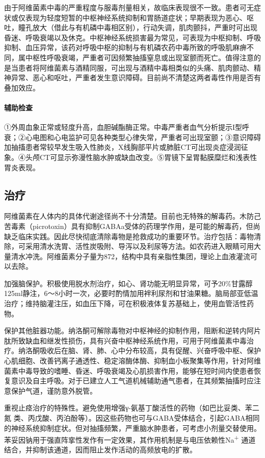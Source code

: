 由于阿维菌素中毒的严重程度与服毒剂量相关，故临床表现很不一致。患者可无症状或仅表现为轻度短暂的中枢神经系统抑制和胃肠道症状；早期表现为恶心、呕吐，瞳孔放大（借此与有机磷中毒相区别），行动失调，肌肉颤抖，严重时可出现昏迷、呼吸衰竭以及休克。中枢神经系统损害最为常见，可表现为中枢抑制、呼吸抑制、血压异常，该药对呼吸中枢的抑制与有机磷农药中毒所致的呼吸肌麻痹不同，属中枢性呼吸衰竭，严重者可因频繁抽搐窒息或出现室颤而死亡。值得注意的是当患者将阿维菌素与酒精同服，可出现与酒精中毒相类似的头痛、肌肉颤动、精神异常、恶心和呕吐，严重者发生意识障碍。目前尚不清楚这两者毒性作用是否有叠加效应。

\paragraph{辅助检查}

①外周血象正常或轻度升高，血胆碱酯酶正常。中毒严重者血气分析提示I型呼衰；②心电图和心电监护可见各种类型心律失常，严重者可出现室颤；③意识障碍加抽搐患者常较早发生吸入性肺炎，X线胸部平片或肺脏CT可出现炎症浸润征象。④头颅CT可显示弥漫性脑水肿或缺血改变。⑤胃镜下呈胃黏膜糜烂和浅表性胃炎表现。

\subsection{治疗}

阿维菌素在人体内的具体代谢途径尚不十分清楚。目前也无特殊的解毒药。木防己苦毒素（picrotoxin）具有抑制GABAa受体的药理学作用，是可能的解毒药，但尚缺乏临床实践。因此尽快彻底清除毒物是抢救成功的重要环节。治疗包括：毒物清除，可采用清水洗胃、活性炭吸附、导泻以及利尿等方法。如农药进入眼睛可用大量清水冲洗。阿维菌素分子量为872，结构中具有亲脂性集团，理论上血液灌流可以去除。

加强脑保护。积极使用脱水剂治疗，如心、肾功能无明显异常，可予20\%甘露醇125ml静注，6～8小时一次，必要时酌情加用袢利尿剂和甘油果糖。脑局部亚低温治疗；维持脑灌注压，如血压下降，可在积极液体复苏基础上，使用血管活性药物。

保护其他脏器功能。纳洛酮可解除毒物对中枢神经的抑制作用，阻断和逆转内阿片肽所致缺血和继发性损伤，具有兴奋中枢神经系统作用，可用于阿维菌素中毒治疗。纳洛酮吸收后在脑、肾、肺、心中分布较高，具有促醒、兴奋呼吸中枢、保护心肌细胞、改善钙离子通透性、稳定溶酶体酶、抑制血小板聚集等作用，针对阿维菌素中毒导致的嗜睡、昏迷、呼吸衰竭及心肌损害作用，能够在短时间内使患者恢复意识及自主呼吸。对于已建立人工气道机械辅助通气患者，在其频繁抽搐时应注意保护气道，谨防意外脱管。

重视止痉治疗的特殊性。避免使用增强γ-氨基丁酸活性的药物（如巴比妥类、苯二氮
{}
类、丙戊酸、丙泊酚等）。因这些药物也可与GABA受体结合，引起GABA相同的神经系统抑制症状。但对抽搐频繁，严重脑水肿患者，可考虑小剂量交替使用。苯妥因钠用于强直阵挛性发作有一定效果，其作用机制是与电压依赖性Na\textsuperscript{+}
通道结合，并抑制该通道，因而阻止发作活动的高频放电的扩散。

